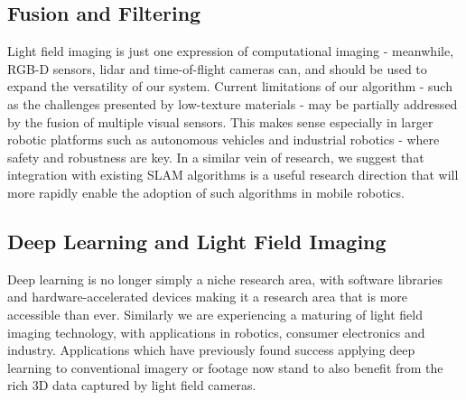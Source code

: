 \subsection{Fusion and Filtering}
Light field imaging is just one expression of computational imaging - meanwhile, RGB-D sensors, lidar and time-of-flight cameras can, and should be used to expand the versatility of our system. Current limitations of our algorithm - such as the challenges presented by low-texture materials - may be partially addressed by the fusion of multiple visual sensors. This makes sense especially in larger robotic platforms such as autonomous vehicles and industrial robotics - where safety and robustness are key. In a similar vein of research, we suggest that integration with existing SLAM algorithms is a useful research direction that will more rapidly enable the adoption of such algorithms in mobile robotics.

\subsection{Deep Learning and Light Field Imaging}
Deep learning is no longer simply a niche research area, with software libraries and hardware-accelerated devices making it a research area that is more accessible than ever. Similarly we are experiencing a maturing of light field imaging technology, with applications in robotics, consumer electronics and industry. Applications which have previously found success applying deep learning to conventional imagery or footage now stand to also benefit from the rich 3D data captured by light field cameras. 